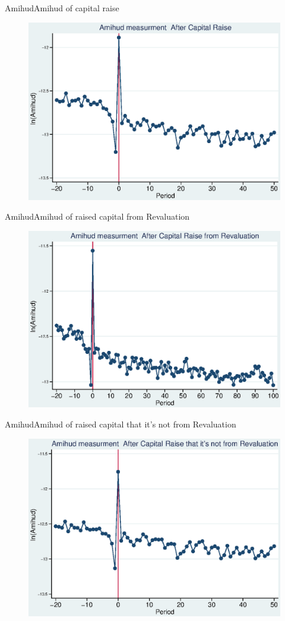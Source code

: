 \documentclass{beamer}
\begin{document}
\begin{frame}{Amihud}{Amihud of capital raise}
\begin{figure}
\centering
\includegraphics[width=0.7\linewidth]{Output/Amihud.eps}
\label{fig:amihud}
\end{figure}
\end{frame}



\begin{frame}{Amihud}{Amihud of raised capital from Revaluation}
\begin{figure}
\centering
\includegraphics[width=0.7\linewidth]{Output/Amihud_Revaluation.eps}
\label{fig:amihudrevaluation}
\end{figure}
\end{frame}

\begin{frame}{Amihud}{Amihud of raised capital that it's not from Revaluation}
\begin{figure}
\centering
\includegraphics[width=0.7\linewidth]{Output/Amihud_NoRevaluation.eps}
\label{fig:amihudnorevaluation}
\end{figure}
\end{frame}
\end{document}
